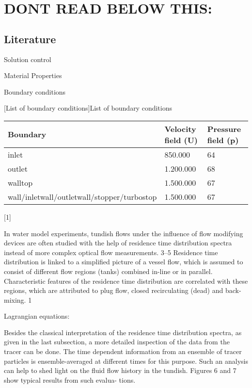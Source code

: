 \section{DONT READ BELOW THIS:}

\subsection{Literature}


Solution control

Material Properties

Boundary conditions

\begin{center}
[List of boundary conditions]{List of boundary conditions} 
\label{tab:title3}
\begin{tabular}{ | P{5cm} | P{5cm}| P{5cm}| } 
\hline
\textbf{Boundary} & \textbf{Velocity field (U)} & \textbf{Pressure field (p)} \\ 
\hline
inlet & 850.000 & 64  \\ 
\hline
outlet & 1.200.000 & 68\\		
\hline
walltop & 1.500.000 & 67\\
\hline
wall/inletwall/outletwall/stopper/turbostop & 1.500.000 & 67\\
\hline
\end{tabular}
\end{center} 


[1]

In water model experiments, tundish flows under the
influence of flow modifying devices are often studied
with the help of residence time distribution spectra
instead of more complex optical flow measurements. 3–5
Residence time distribution is linked to a simplified
picture of a vessel flow, which is assumed to consist of
different flow regions (tanks) combined in-line or in
parallel. Characteristic features of the residence time
distribution are correlated with these regions, which are
attributed to plug flow, closed recirculating (dead) and
back-mixing. 1

Lagrangian equations:

Besides the classical interpretation of the residence time
distribution spectra, as given in the last subsection, a
more detailed inspection of the data from the tracer can
be done. The time dependent information from an
ensemble of tracer particles is ensemble-averaged at
different times for this purpose. Such an analysis can
help to shed light on the fluid flow history in the tundish.
Figures 6 and 7 show typical results from such evalua-
tions.

